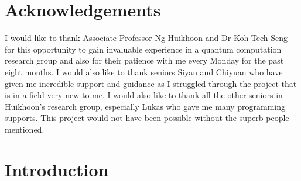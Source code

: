 \documentclass[12pt]{report}
\begin{document}
\chapter*{Acknowledgements}
I would like to thank Associate Professor Ng Huikhoon and Dr Koh Tech Seng for this opportunity to gain invaluable experience in a quantum computation research group and also for their patience with me every Monday for the past eight months.
I would also like to thank seniors Siyan and Chiyuan who have given me incredible support and guidance as I struggled through the project that is in a field very new to me. 
I would also like to thank all the other seniors in Huikhoon's research group, especially Lukas who gave me many programming supports.
This project would not have been possible without the superb people mentioned.

\tableofcontents
\chapter{Introduction}

\end{document}
